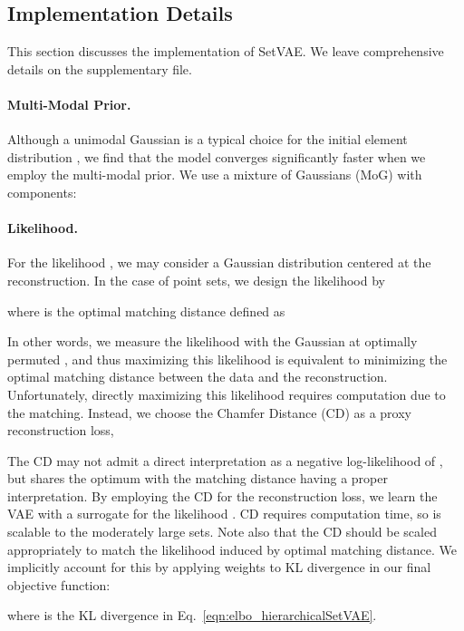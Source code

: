 \documentclass[final]{arxiv/cvpr}
\newcommand{\cutsubsectiondown}{\vspace*{-0.07in}}
\newcommand{\cutparagraphup}{\vspace*{-0.1in}}
\begin{document}
\subsection{Implementation Details}
\label{sec:implementation}
\cutsubsectiondown
This section discusses the implementation of SetVAE.
We leave comprehensive details on the supplementary file.

\cutparagraphup
\paragraph{Multi-Modal Prior.} 
Although a unimodal Gaussian is a typical choice for the initial element distribution  \cite{kosiorek2020conditional, yang2019pointflow}, we find that the model converges significantly faster when we employ the multi-modal prior.
We use a mixture of Gaussians (MoG) with  components:


\cutparagraphup
\paragraph{Likelihood.}
For the likelihood , we may consider a Gaussian distribution centered at the reconstruction.
In the case of point sets, we design the likelihood by

where  is the optimal matching distance defined as

In other words, we measure the likelihood with the Gaussian at optimally permuted , and thus maximizing this likelihood is equivalent to minimizing the optimal matching distance between the data and the reconstruction. Unfortunately, directly maximizing this likelihood requires  computation due to the matching. Instead, we choose the Chamfer Distance (CD) as a proxy reconstruction loss,


The CD may not admit a direct interpretation as a negative log-likelihood of , but shares the optimum with the matching distance having a proper interpretation. 
By employing the CD for the reconstruction loss, we learn the VAE with a surrogate for the likelihood .
CD requires  computation time, so is scalable to the moderately large sets.
Note also that the CD should be scaled appropriately to match the likelihood induced by optimal matching distance.
We implicitly account for this by applying weights to KL divergence in our final objective function:

where  is the KL divergence in Eq.~\eqref{eqn:elbo_hierarchicalSetVAE}.
\end{document}
